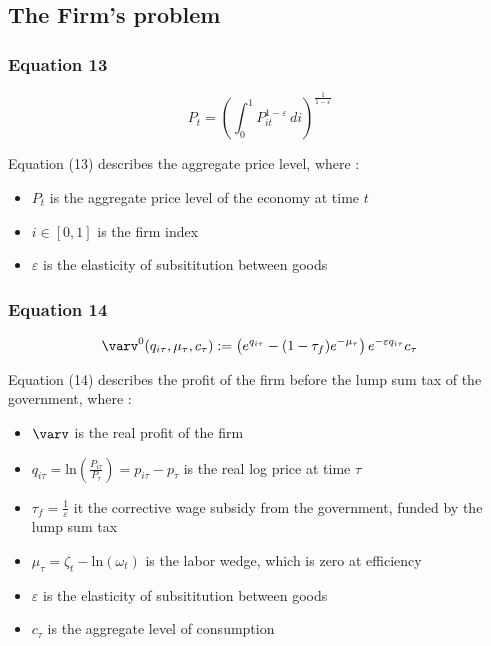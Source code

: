 \documentclass{article}
\begin{document}
\subsection{The Firm's problem}

\subsubsection*{Equation 13}
\begin{equation}
    P_{t}=\left(\int_{0}^{1}P_{it}^{1-\varepsilon}\,di\right)^{\frac{1}{1-\varepsilon}}
\end{equation}

Equation (13) describes the aggregate price level, where : 
\begin{itemize}
    \item $P_{t}$ is the aggregate price level of the economy at time $t$
    \item $i\in\left[0,1\right]$ is the firm index
    \item $\varepsilon$ is the elasticity of subsititution between goods
\end{itemize}

\subsubsection*{Equation 14}
\begin{equation}
    \varv^{0}(q_{i\tau},\mu_{\tau},c_{\tau}):=\left(e^{q_{i\tau}}-(1-\tau_{f})e^{-\mu_{\tau}}\right)e^{-\varepsilon q_{i\tau}}c_{\tau}
\end{equation}

Equation (14) describes the profit of the firm before the lump sum tax of the government, where : 
\begin{itemize}
    \item $\varv$ is the real profit of the firm
    \item $q_{i\tau}=\text{ln}\left(\frac{P_{i\tau}}{P_{\tau}}\right)=p_{i\tau}-p_{\tau}$ is the real log price at time $\tau$
    \item $\tau_f=\frac{1}{\varepsilon}$ it the corrective wage subsidy from the government, funded by the lump sum tax
    \item $\mu_{\tau}=\zeta_{t}-\text{ln}(\omega_{t})$ is the labor wedge, which is zero at efficiency
    \item $\varepsilon$ is the elasticity of subsititution between goods
    \item $c_{\tau}$ is the aggregate level of consumption
\end{itemize}
\end{document}
